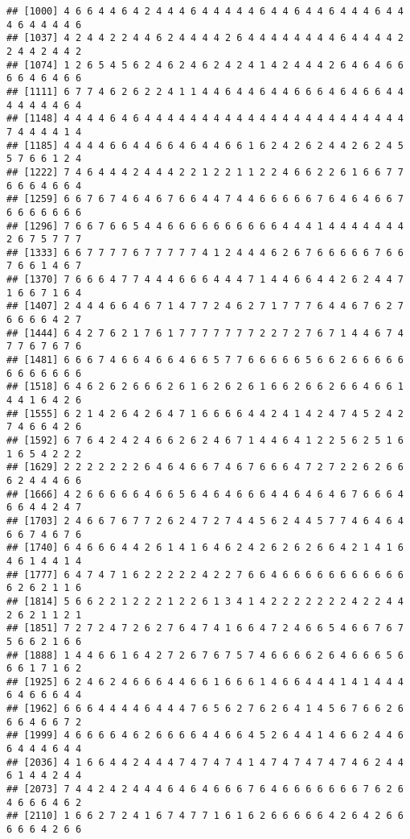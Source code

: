 \documentclass[
]{article}
\begin{document}
\begin{verbatim}
## [1000] 4 6 6 4 4 6 4 2 4 4 4 6 4 4 4 4 4 6 4 4 6 4 4 6 4 4 4 6 4 4 4 6 4 4 4 4 6
## [1037] 4 2 4 4 2 2 4 4 6 2 4 4 4 4 2 6 4 4 4 4 4 4 4 4 6 4 4 4 4 2 2 4 4 2 4 4 2
## [1074] 1 2 6 5 4 5 6 2 4 6 2 4 6 2 4 2 4 1 4 2 4 4 4 2 6 4 6 4 6 6 6 6 4 6 4 6 6
## [1111] 6 7 7 4 6 2 6 2 2 4 1 1 4 4 6 4 4 6 4 4 6 6 6 4 6 4 6 6 4 4 4 4 4 4 4 6 4
## [1148] 4 4 4 4 6 4 6 4 4 4 4 4 4 4 4 4 4 4 4 4 4 4 4 4 4 4 4 4 4 4 7 4 4 4 4 1 4
## [1185] 4 4 4 4 6 6 4 4 6 6 4 6 4 4 6 6 1 6 2 4 2 6 2 4 4 2 6 2 4 5 5 7 6 6 1 2 4
## [1222] 7 4 6 4 4 4 2 4 4 4 2 2 1 2 2 1 1 2 2 4 6 6 2 2 6 1 6 6 7 7 6 6 6 4 6 6 4
## [1259] 6 6 7 6 7 4 6 4 6 7 6 6 4 4 7 4 4 6 6 6 6 6 7 6 4 6 4 6 6 7 6 6 6 6 6 6 6
## [1296] 7 6 6 7 6 6 5 4 4 6 6 6 6 6 6 6 6 6 6 4 4 4 1 4 4 4 4 4 4 4 2 6 7 5 7 7 7
## [1333] 6 6 7 7 7 7 6 7 7 7 7 7 4 1 2 4 4 4 6 2 6 7 6 6 6 6 6 7 6 6 7 6 6 1 4 6 7
## [1370] 7 6 6 6 4 7 7 4 4 4 6 6 6 4 4 4 7 1 4 4 6 6 4 4 2 6 2 4 4 7 1 6 6 7 1 6 4
## [1407] 2 4 4 4 6 6 4 6 7 1 4 7 7 2 4 6 2 7 1 7 7 7 6 4 4 6 7 6 2 7 6 6 6 6 4 2 7
## [1444] 6 4 2 7 6 2 1 7 6 1 7 7 7 7 7 7 7 2 2 7 2 7 6 7 1 4 4 6 7 4 7 7 6 7 6 7 6
## [1481] 6 6 6 7 4 6 6 4 6 6 4 6 6 5 7 7 6 6 6 6 6 5 6 6 2 6 6 6 6 6 6 6 6 6 6 6 6
## [1518] 6 4 6 2 6 2 6 6 6 2 6 1 6 2 6 2 6 1 6 6 2 6 6 2 6 6 4 6 6 1 4 4 1 6 4 2 6
## [1555] 6 2 1 4 2 6 4 2 6 4 7 1 6 6 6 6 4 4 2 4 1 4 2 4 7 4 5 2 4 2 7 4 6 6 4 2 6
## [1592] 6 7 6 4 2 4 2 4 6 6 2 6 2 4 6 7 1 4 4 6 4 1 2 2 5 6 2 5 1 6 1 6 5 4 2 2 2
## [1629] 2 2 2 2 2 2 2 6 4 6 4 6 6 7 4 6 7 6 6 6 4 7 2 7 2 2 6 2 6 6 6 2 4 4 4 6 6
## [1666] 4 2 6 6 6 6 6 4 6 6 5 6 4 6 4 6 6 6 4 4 6 4 6 4 6 7 6 6 6 4 6 6 4 4 2 4 7
## [1703] 2 4 6 6 7 6 7 7 2 6 2 4 7 2 7 4 4 5 6 2 4 4 5 7 7 4 6 4 6 4 6 6 7 4 6 7 6
## [1740] 6 4 6 6 6 4 4 2 6 1 4 1 6 4 6 2 4 2 6 2 6 2 6 6 4 2 1 4 1 6 4 6 1 4 4 1 4
## [1777] 6 4 7 4 7 1 6 2 2 2 2 2 4 2 2 7 6 6 4 6 6 6 6 6 6 6 6 6 6 6 6 2 6 2 1 1 6
## [1814] 5 6 6 2 2 1 2 2 2 1 2 2 6 1 3 4 1 4 2 2 2 2 2 2 2 4 2 2 4 4 2 6 2 1 1 2 1
## [1851] 7 2 7 2 4 7 2 6 2 7 6 4 7 4 1 6 6 4 7 2 4 6 6 5 4 6 6 7 6 7 5 6 6 2 1 6 6
## [1888] 1 4 4 6 6 1 6 4 2 7 2 6 7 6 7 5 7 4 6 6 6 6 2 6 4 6 6 6 5 6 6 6 1 7 1 6 2
## [1925] 6 2 4 6 2 4 6 6 6 4 4 6 6 1 6 6 6 1 4 6 6 4 4 4 1 4 1 4 4 4 6 4 6 6 6 4 4
## [1962] 6 6 6 4 4 4 4 6 4 4 4 7 6 5 6 2 7 6 2 6 4 1 4 5 6 7 6 6 2 6 6 6 4 6 6 7 2
## [1999] 4 6 6 6 6 4 6 2 6 6 6 6 4 4 6 6 4 5 2 6 4 4 1 4 6 6 2 4 4 6 6 4 4 4 6 4 4
## [2036] 4 1 6 6 4 4 2 4 4 4 7 4 7 4 7 4 1 4 7 4 7 4 7 4 7 4 6 2 4 4 6 1 4 4 2 4 4
## [2073] 7 4 4 2 4 2 4 4 4 6 4 6 4 6 6 6 7 6 4 6 6 6 6 6 6 6 7 6 2 6 4 6 6 6 4 6 2
## [2110] 1 6 6 2 7 2 4 1 6 7 4 7 7 1 6 1 6 2 6 6 6 6 6 4 2 6 4 2 6 6 6 6 6 4 2 6 6

\end{verbatim}
\end{document}

